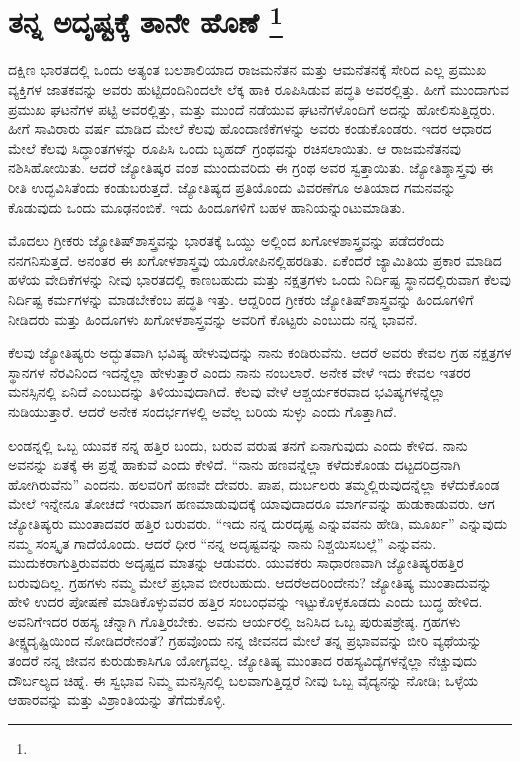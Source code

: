 
\vspace{-0.5cm}

\chapter[ತನ್ನ ಅದೃಷ್ಟಕ್ಕೆ ತಾನೇ ಹೊಣೆ ]{ತನ್ನ ಅದೃಷ್ಟಕ್ಕೆ ತಾನೇ ಹೊಣೆ \protect\footnote{}}

ದಕ್ಷಿಣ ಭಾರತದಲ್ಲಿ ಒಂದು ಅತ್ಯಂತ ಬಲಶಾಲಿಯಾದ ರಾಜಮನೆತನ ಮತ್ತು ಆ\break ಮನೆತನಕ್ಕೆ ಸೇರಿದ ಎಲ್ಲ ಪ್ರಮುಖ ವ್ಯಕ್ತಿಗಳ ಜಾತಕವನ್ನು ಅವರು ಹುಟ್ಟಿದಂದಿನಿಂದಲೇ ಲೆಕ್ಕ ಹಾಕಿ ರೂಪಿಸಿಡುವ ಪದ್ಧತಿ ಅವರಲ್ಲಿತ್ತು. ಹೀಗೆ ಮುಂದಾಗುವ ಪ್ರಮುಖ ಘಟನೆಗಳ ಪಟ್ಟಿ ಅವರಲ್ಲಿತ್ತು, ಮತ್ತು ಮುಂದೆ ನಡೆಯುವ ಘಟನೆಗಳೊಂದಿಗೆ ಅದನ್ನು ಹೋಲಿಸುತ್ತಿದ್ದರು. ಹೀಗೆ ಸಾವಿರಾರು ವರ್ಷ ಮಾಡಿದ ಮೇಲೆ ಕೆಲವು ಹೊಂದಾಣಿಕೆಗಳನ್ನು ಅವರು ಕಂಡುಕೊಂಡರು. ಇದರ ಆಧಾರದ ಮೇಲೆ ಕೆಲವು ಸಿದ್ಧಾಂತಗಳನ್ನು ರೂಪಿಸಿ ಒಂದು ಬೃಹದ್​ ಗ್ರಂಥವನ್ನು ರಚಿಸಲಾಯಿತು. ಆ ರಾಜಮನೆತನವು ನಶಿಸಿಹೋಯಿತು. ಆದರೆ ಜ್ಯೋತಿಷ್ಕರ ವಂಶ ಮುಂದುವರಿದು ಈ ಗ್ರಂಥ ಅವರ ಸ್ವತ್ತಾಯಿತು. ಜ್ಯೋತಿಶ್ಶಾಸ್ತ್ರವು ಈ ರೀತಿ ಉದ್ಭವಿಸಿತೆಂದು ಕಂಡುಬರುತ್ತದೆ. ಜ್ಯೋತಿಷ್ಯದ ಪ್ರತಿಯೊಂದು ವಿವರಣೆಗೂ ಅತಿಯಾದ ಗಮನವನ್ನು ಕೊಡುವುದು ಒಂದು ಮೂಢನಂಬಿಕೆ. ಇದು ಹಿಂದೂಗಳಿಗೆ ಬಹಳ ಹಾನಿಯನ್ನುಂಟುಮಾಡಿತು.

ಮೊದಲು ಗ್ರೀಕರು ಜ್ಯೋತಿಷ್​ಶಾಸ್ತ್ರವನ್ನು ಭಾರತಕ್ಕೆ ಒಯ್ದು ಅಲ್ಲಿಂದ ಖಗೋಳಶಾಸ್ತ್ರ\-ವನ್ನು ಪಡೆದರೆಂದು ನನಗನಿಸುತ್ತದೆ. ಅನಂತರ ಈ ಖಗೋಳಶಾಸ್ತ್ರವು ಯೂರೋಪಿನಲ್ಲಿ\break ಹರಡಿತು. ಏಕೆಂದರೆ ಜ್ಯಾಮಿತಿಯ ಪ್ರಕಾರ ಮಾಡಿದ ಹಳೆಯ ವೇದಿಕೆಗಳನ್ನು ನೀವು ಭಾರತದಲ್ಲಿ ಕಾಣಬಹುದು ಮತ್ತು ನಕ್ಷತ್ರಗಳು ಒಂದು ನಿರ್ದಿಷ್ಟ ಸ್ಥಾನದಲ್ಲಿರುವಾಗ ಕೆಲವು ನಿರ್ದಿಷ್ಟ ಕರ್ಮಗಳನ್ನು ಮಾಡಬೇಕೆಂಬ ಪದ್ಧತಿ ಇತ್ತು. ಆದ್ದರಿಂದ ಗ್ರೀಕರು ಜ್ಯೋತಿಷ್​ಶಾಸ್ತ್ರವನ್ನು ಹಿಂದೂಗಳಿಗೆ ನೀಡಿದರು ಮತ್ತು ಹಿಂದೂಗಳು ಖಗೋಳಶಾಸ್ತ್ರವನ್ನು ಅವರಿಗೆ ಕೊಟ್ಟರು ಎಂಬುದು ನನ್ನ ಭಾವನೆ.

\vskip 4pt

ಕೆಲವು ಜ್ಯೋತಿಷ್ಯರು ಅದ್ಭುತವಾಗಿ ಭವಿಷ್ಯ ಹೇಳುವುದನ್ನು ನಾನು ಕಂಡಿರುವೆನು. ಆದರೆ ಅವರು ಕೇವಲ ಗ್ರಹ ನಕ್ಷತ್ರಗಳ ಸ್ಥಾನಗಳ ನೆರವಿನಿಂದ ಇದನ್ನೆಲ್ಲಾ ಹೇಳುತ್ತಾರೆ ಎಂದು ನಾನು ನಂಬಲಾರೆ. ಅನೇಕ ವೇಳೆ ಇದು ಕೇವಲ ಇತರರ ಮನಸ್ಸಿನಲ್ಲಿ ಏನಿದೆ ಎಂಬು\-ದನ್ನು ತಿಳಿಯುವುದಾಗಿದೆ. ಕೆಲವು ವೇಳೆ ಆಶ್ಚರ್ಯಕರವಾದ ಭವಿಷ್ಯಗಳನ್ನೆಲ್ಲಾ ನುಡಿಯು\-ತ್ತಾರೆ. ಆದರೆ ಅನೇಕ ಸಂದರ್ಭಗಳಲ್ಲಿ ಅವೆಲ್ಲ ಬರಿಯ ಸುಳ್ಳು ಎಂದು ಗೊತ್ತಾಗಿದೆ.

\vskip 4pt

ಲಂಡನ್ನಲ್ಲಿ ಒಬ್ಬ ಯುವಕ ನನ್ನ ಹತ್ತಿರ ಬಂದು, ಬರುವ ವರುಷ ತನಗೆ ಏನಾಗುವುದು ಎಂದು ಕೇಳಿದ. ನಾನು ಅವನನ್ನು ಏತಕ್ಕೆ ಈ ಪ್ರಶ್ನೆ ಹಾಕುವೆ ಎಂದು ಕೇಳಿದೆ. “ನಾನು ಹಣವನ್ನೆಲ್ಲಾ ಕಳೆದುಕೊಂಡು ದಟ್ಟದರಿದ್ರನಾಗಿ ಹೋಗಿರುವೆನು” ಎಂದನು. ಹಲವರಿಗೆ ಹಣವೇ ದೇವರು. ಪಾಪ, ದುರ್ಬಲರು ತಮ್ಮಲ್ಲಿರುವುದನ್ನೆಲ್ಲಾ ಕಳೆದುಕೊಂಡ ಮೇಲೆ ಇನ್ನೇನೂ ತೋಚದೆ ಇರುವಾಗ ಹಣಮಾಡುವುದಕ್ಕೆ ಯಾವುದಾದರೂ ಮಾರ್ಗವನ್ನು ಹುಡುಕಾಡುವರು. ಆಗ ಜ್ಯೋತಿಷ್ಯರು ಮುಂತಾದವರ ಹತ್ತಿರ ಬರುವರು. “ಇದು ನನ್ನ ದುರದೃಷ್ಟ ಎನ್ನುವವನು ಹೇಡಿ, ಮೂರ್ಖ” ಎನ್ನುವುದು ನಮ್ಮ ಸಂಸ್ಕೃತ ಗಾದೆಯೊಂದು. ಆದರೆ ಧೀರ “ನನ್ನ ಅದೃಷ್ಟವನ್ನು ನಾನು ನಿಶ್ಚಯಿಸಬಲ್ಲೆ” ಎನ್ನುವನು. ಮುದುಕರಾಗುತ್ತಿರು\-ವವರು ಅದೃಷ್ಟದ ಮಾತನ್ನು ಆಡುವರು. ಯುವಕರು ಸಾಧಾರಣವಾಗಿ ಜ್ಯೋತಿಷ್ಯರ\break ಹತ್ತಿರ ಬರುವುದಿಲ್ಲ. ಗ್ರಹಗಳು ನಮ್ಮ ಮೇಲೆ ಪ್ರಭಾವ ಬೀರಬಹುದು. ಆದರೆ\break ಅದರಿಂದೇನು? ಜ್ಯೋತಿಷ್ಯ ಮುಂತಾದುವನ್ನು ಹೇಳಿ ಉದರ ಪೋಷಣೆ ಮಾಡಿಕೊಳ್ಳುವವರ ಹತ್ತಿರ ಸಂಬಂಧವನ್ನು ಇಟ್ಟುಕೊಳ್ಳಕೂಡದು ಎಂದು ಬುದ್ಧ ಹೇಳಿದ. ಅವನಿಗೆ\break ಇದರ ರಹಸ್ಯ ಚೆನ್ನಾಗಿ ಗೊತ್ತಿರಬೇಕು. ಅವನು ಆರ್ಯರಲ್ಲಿ ಜನಿಸಿದ ಒಬ್ಬ ಪುರುಷ\break ಶ್ರೇಷ್ಠ. ಗ್ರಹಗಳು ತೀಕ್ಷ್ಣದೃಷ್ಟಿಯಿಂದ ನೋಡಿದರೇನಂತೆ? ಗ್ರಹವೊಂದು ನನ್ನ ಜೀವನದ ಮೇಲೆ ತನ್ನ ಪ್ರಭಾವವನ್ನು ಬೀರಿ ವ್ಯಥೆಯನ್ನು ತಂದರೆ ನನ್ನ ಜೀವನ ಕುರುಡುಕಾಸಿಗೂ ಯೋಗ್ಯವಲ್ಲ. ಜ್ಯೋತಿಷ್ಯ ಮುಂತಾದ ರಹಸ್ಯವಿದ್ಯೆಗಳನ್ನೆಲ್ಲಾ ನೆಚ್ಚುವುದು ದೌರ್ಬಲ್ಯದ ಚಿಹ್ನೆ. ಈ ಸ್ವಭಾವ ನಿಮ್ಮ ಮನಸ್ಸಿನಲ್ಲಿ ಬಲವಾಗುತ್ತಿದ್ದರೆ ನೀವು ಒಬ್ಬ ವೈದ್ಯನನ್ನು ನೋಡಿ; ಒಳ್ಳೆಯ ಆಹಾರವನ್ನು ಮತ್ತು ವಿಶ್ರಾಂತಿಯನ್ನು ತೆಗೆದುಕೊಳ್ಳಿ.

